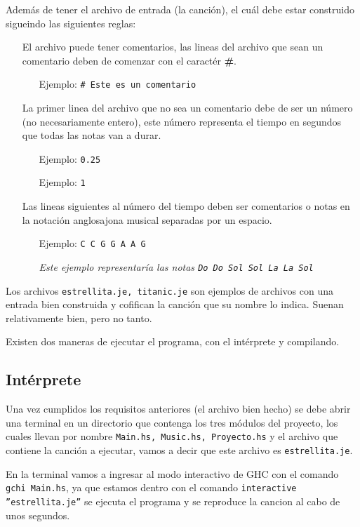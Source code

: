 \documentclass[10pt,a4paper]{article}
\begin{document}
Además de tener el archivo de entrada (la canción), el cuál debe estar construido
sigueindo las siguientes reglas:
\begin{itemize}
\item[\textbullet] El archivo puede tener comentarios, las lineas del archivo que
  sean un comentario deben de comenzar con el caractér \textbf{\#}.
  \begin{itemize}
  \item [Ejemplo:] \texttt{\# Este es un comentario}
  \end{itemize}
\item[\textbullet] La primer linea del archivo que no sea un comentario debe de
  ser un número (no necesariamente entero), este número  representa el tiempo en
  segundos que todas las notas van a durar.
  \begin{itemize}
  \item [Ejemplo:] \texttt{0.25}
  \item [Ejemplo:] \texttt{1}
  \end{itemize}
\item[\textbullet] Las lineas siguientes al número del tiempo deben ser
  comentarios o notas en la notación anglosajona musical separadas por un espacio.
  \begin{itemize}
  \item [Ejemplo:] \texttt{C C G G A A G}

    \textit{Este ejemplo representaría las notas
      \texttt{Do Do Sol Sol La La Sol}}
  \end{itemize}
\end{itemize}

Los archivos \texttt{estrellita.je, titanic.je} son ejemplos de archivos con una
entrada bien construida y cofifican la canción que su nombre lo indica. Suenan
relativamente bien, pero no tanto.

Existen dos maneras de ejecutar el programa, con el intérprete y compilando.

\subsection{Intérprete}
Una vez cumplidos los requisitos anteriores (el archivo bien hecho) se debe abrir
una terminal en un directorio que contenga los tres módulos del proyecto, los
cuales llevan por nombre \texttt{Main.hs, Music.hs, Proyecto.hs} y el archivo que
contiene la canción a ejecutar, vamos a decir que este archivo es
\texttt{estrellita.je}.

En la terminal vamos a ingresar al modo interactivo de GHC con el comando
\texttt{gchi Main.hs}, ya que estamos dentro con el comando
\texttt{interactive ''estrellita.je''} se ejecuta el programa y se reproduce la
cancion al cabo de unos segundos.
\end{document}
